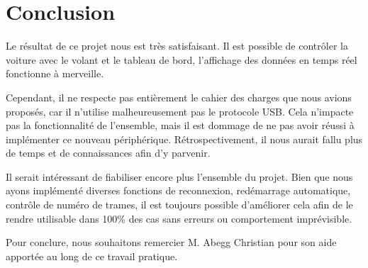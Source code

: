 \documentclass[french, 11pt]{article}
\begin{document}
    \section{Conclusion}

		
	Le résultat de ce projet nous est très satisfaisant. Il est possible de contrôler la voiture avec le volant et le tableau de bord, l'affichage des données en temps réel fonctionne à merveille.

	Cependant, il ne respecte pas entièrement le cahier des charges que nous avions proposés, car il n'utilise malheureusement pas le protocole USB. Cela n'impacte pas la fonctionnalité de l'ensemble, mais il est dommage de ne pas avoir réussi à implémenter ce nouveau périphérique. Rétrospectivement, il nous aurait fallu plus de temps et de connaissances afin d'y parvenir.

	Il serait intéressant de fiabiliser encore plus l'ensemble du projet. Bien que nous ayons implémenté diverses fonctions de reconnexion, redémarrage automatique, contrôle de numéro de trames, il est toujours possible d'améliorer cela afin de le rendre utilisable dans 100\% des cas sans erreurs ou comportement imprévisible.

	Pour conclure, nous souhaitons remercier M. Abegg Christian pour son aide apportée au long de ce travail pratique.




	\newpage

	\nocite{*}
    \printbibliography
   
\end{document}
